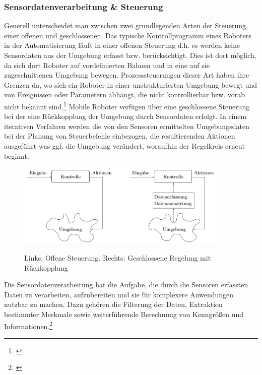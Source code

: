\subsubsection{Sensordatenverarbeitung \& Steuerung}
Generell unterscheidet man zwischen zwei grundlegenden Arten der Steuerung, einer offenen und geschlossenen. Das typische Kontrollprogramm eines Roboters in der Automatisierung läuft in einer offenen Steuerung d.h. es werden keine Sensordaten aus der Umgebung erfasst bzw. berücksichtigt. Dies ist dort möglich, da sich dort Roboter auf vordefinierten Bahnen und in eine auf sie zugeschnittenen Umgebung bewegen.
\newline
Prozesssteuerungen dieser Art haben ihre Grenzen da, wo sich ein Roboter in einer unstrukturierten Umgebung bewegt und von Ereignissen oder Parametern abhängt, die nicht kontrollierbar bzw. vorab nicht bekannt sind.\footnote{\citep[vgl.][Mobile Roboter, Seite 3 f.]{Hertzberg.MobileRoboter}\label{note14}}
Mobile Roboter verfügen über eine geschlossene Steuerung bei der eine Rückkopplung der Umgebung durch Sensordaten erfolgt. In einem iterativen Verfahren werden die von den Sensoren ermittelten Umgebungsdaten bei der Planung von Steuerbefehle einbezogen, die resultierenden Aktionen ausgeführt was ggf. die Umgebung verändert, woraufhin der Regelkreis erneut beginnt.
\begin{figure}[ht]
	\centering
		\includegraphics[width=0.90\textwidth]{images/technische_grundlagen/Steuerungsarten.png}
		\caption[Vergleich Offene und Geschlossene Steuerung]{Links: Offene Steuerung. Rechts: Geschlossene Regelung mit Rückkopplung}
		\cite{Hertzberg.MobileRoboter}
\end{figure}
\newline
Die Sensordatenverarbeitung hat die Aufgabe, die durch die Sensoren erfassten Daten zu verarbeiten, aufzubereiten und sie für komplexere Anwendungen nutzbar zu machen. Dazu gehören die Filterung der Daten, Extraktion bestimmter Merkmale sowie weiterführende Berechnung von Kenngrößen und Informationen.\footnote{\citep[vgl.][Mobile Roboter, Seite 67]{Hertzberg.MobileRoboter}\label{note15}}
